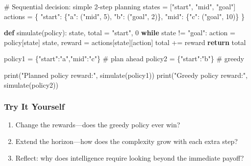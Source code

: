 \documentclass[
  letterpaper,
  DIV=11,
  numbers=noendperiod]{scrreprt}
\newenvironment{Shaded}{\begin{snugshade}}{\end{snugshade}}
\newcommand{\BuiltInTok}[1]{\textcolor[rgb]{0.00,0.23,0.31}{#1}}
\newcommand{\CommentTok}[1]{\textcolor[rgb]{0.37,0.37,0.37}{#1}}
\newcommand{\ControlFlowTok}[1]{\textcolor[rgb]{0.00,0.23,0.31}{\textbf{#1}}}
\newcommand{\DecValTok}[1]{\textcolor[rgb]{0.68,0.00,0.00}{#1}}
\newcommand{\KeywordTok}[1]{\textcolor[rgb]{0.00,0.23,0.31}{\textbf{#1}}}
\newcommand{\NormalTok}[1]{\textcolor[rgb]{0.00,0.23,0.31}{#1}}
\newcommand{\OperatorTok}[1]{\textcolor[rgb]{0.37,0.37,0.37}{#1}}
\newcommand{\StringTok}[1]{\textcolor[rgb]{0.13,0.47,0.30}{#1}}
\providecommand{\tightlist}{%
  \setlength{\itemsep}{0pt}\setlength{\parskip}{0pt}}
\begin{document}
\begin{Shaded}
\begin{Highlighting}[]
\CommentTok{\# Sequential decision: simple 2{-}step planning}
\NormalTok{states }\OperatorTok{=}\NormalTok{ [}\StringTok{"start"}\NormalTok{, }\StringTok{"mid"}\NormalTok{, }\StringTok{"goal"}\NormalTok{]}
\NormalTok{actions }\OperatorTok{=}\NormalTok{ \{}
    \StringTok{"start"}\NormalTok{: \{}\StringTok{"a"}\NormalTok{: (}\StringTok{"mid"}\NormalTok{, }\DecValTok{5}\NormalTok{), }\StringTok{"b"}\NormalTok{: (}\StringTok{"goal"}\NormalTok{, }\DecValTok{2}\NormalTok{)\},}
    \StringTok{"mid"}\NormalTok{: \{}\StringTok{"c"}\NormalTok{: (}\StringTok{"goal"}\NormalTok{, }\DecValTok{10}\NormalTok{)\}}
\NormalTok{\}}

\KeywordTok{def}\NormalTok{ simulate(policy):}
\NormalTok{    state, total }\OperatorTok{=} \StringTok{"start"}\NormalTok{, }\DecValTok{0}
    \ControlFlowTok{while}\NormalTok{ state }\OperatorTok{!=} \StringTok{"goal"}\NormalTok{:}
\NormalTok{        action }\OperatorTok{=}\NormalTok{ policy[state]}
\NormalTok{        state, reward }\OperatorTok{=}\NormalTok{ actions[state][action]}
\NormalTok{        total }\OperatorTok{+=}\NormalTok{ reward}
    \ControlFlowTok{return}\NormalTok{ total}

\NormalTok{policy1 }\OperatorTok{=}\NormalTok{ \{}\StringTok{"start"}\NormalTok{:}\StringTok{"a"}\NormalTok{,}\StringTok{"mid"}\NormalTok{:}\StringTok{"c"}\NormalTok{\}  }\CommentTok{\# plan ahead}
\NormalTok{policy2 }\OperatorTok{=}\NormalTok{ \{}\StringTok{"start"}\NormalTok{:}\StringTok{"b"}\NormalTok{\}            }\CommentTok{\# greedy}

\BuiltInTok{print}\NormalTok{(}\StringTok{"Planned policy reward:"}\NormalTok{, simulate(policy1))}
\BuiltInTok{print}\NormalTok{(}\StringTok{"Greedy policy reward:"}\NormalTok{, simulate(policy2))}
\end{Highlighting}
\end{Shaded}

\subsubsection{Try It Yourself}\label{try-it-yourself-68}

\begin{enumerate}
\def\labelenumi{\arabic{enumi}.}
\tightlist
\item
  Change the rewards---does the greedy policy ever win?
\item
  Extend the horizon---how does the complexity grow with each extra
  step?
\item
  Reflect: why does intelligence require looking beyond the immediate
  payoff?
\end{enumerate}
\end{document}
